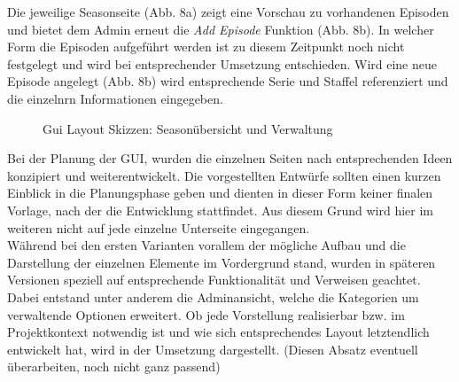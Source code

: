 \documentclass[a4paper]{article}
\begin{document}
Die jeweilige Seasonseite (Abb. 8a) zeigt eine Vorschau zu vorhandenen Episoden und bietet dem Admin erneut die \textit{Add Episode} Funktion (Abb. 8b). In welcher Form die Episoden aufgeführt werden ist zu diesem Zeitpunkt noch nicht festgelegt und wird bei entsprechender Umsetzung entschieden. Wird eine neue Episode angelegt (Abb. 8b) wird entsprechende Serie und Staffel referenziert und die einzelnrn Informationen eingegeben.\\
\begin{figure} [h!]
\centering
\hfill %
\hfill %
\hfill %
\caption{Gui Layout Skizzen: Seasonübersicht und Verwaltung }
\label{Gui}
\end{figure}

Bei der Planung der GUI, wurden die einzelnen Seiten nach entsprechenden Ideen konzipiert und weiterentwickelt. Die vorgestellten Entwürfe sollten einen kurzen Einblick in die Planungsphase geben und dienten in dieser Form keiner finalen Vorlage, nach der die Entwicklung stattfindet. Aus diesem Grund wird hier im weiteren nicht auf jede einzelne Unterseite eingegangen.\\ Während bei den ersten Varianten vorallem der mögliche Aufbau und die Darstellung der einzelnen Elemente im Vordergrund stand, wurden in späteren Versionen speziell auf entsprechende Funktionalität und Verweisen geachtet. Dabei entstand unter anderem die Adminansicht, welche die Kategorien um verwaltende Optionen erweitert. Ob jede Vorstellung realisierbar bzw. im Projektkontext notwendig ist und wie sich entsprechendes Layout letztendlich entwickelt hat, wird in der Umsetzung dargestellt. (Diesen Absatz eventuell überarbeiten, noch nicht ganz passend) \\
\end{document}
